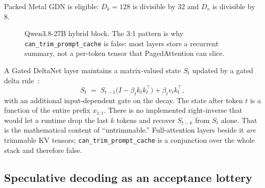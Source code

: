 Packed Metal GDN is eligible: $D_k{=}128$ is divisible by 32 and $D_v$ is divisible by 8.

\begin{figure}[t]
\centering
{}
\caption{Qwen3.8-27B hybrid block. The 3{:}1 pattern is why \texttt{can\_trim\_prompt\_cache} is false: most layers store a recurrent summary, not a per-token tensor that PagedAttention can slice.}
\label{fig:hybrid}
\end{figure}

A Gated DeltaNet layer maintains a matrix-valued state $S_t$ updated by a gated delta rule~\citep{yang2024gateddelta}:
\begin{equation}
  S_t \;=\; S_{t-1}\bigl(I - \beta_t k_t k_t^\top\bigr) + \beta_t v_t k_t^\top,
\end{equation}
with an additional input-dependent gate on the decay. The state after token $t$ is a function of the entire prefix $x_{1:t}$. There is no implemented right-inverse that would let a runtime drop the last $k$ tokens and recover $S_{t-k}$ from $S_t$ alone. That is the mathematical content of ``untrimmable.'' Full-attention layers beside it \emph{are} trimmable KV tensors; \texttt{can\_trim\_prompt\_cache} is a conjunction over the whole stack and therefore false.

\subsection{Speculative decoding as an acceptance lottery}

